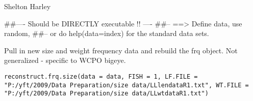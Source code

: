 \documentclass[a4paper]{book}
\begin{document}
%
\begin{Arguments}
\begin{ldescription}
\item[\code{CPUE.file}] 


\item[\code{data}] 


\item[\code{fishery}] 


\end{ldescription}
\end{Arguments}
%
\begin{Author}\relax

Shelton Harley
\end{Author}
%
\begin{Examples}
\begin{ExampleCode}
##---- Should be DIRECTLY executable !! ----
##-- ==>  Define data, use random,
##--	or do  help(data=index)  for the standard data sets.

\end{ExampleCode}
\end{Examples}
%
\begin{Description}\relax

Pull in new size and weight frequency data and rebuild the frq object. Not generalized - specific to WCPO bigeye. 
\end{Description}
%
\begin{Usage}
\begin{verbatim}
reconstruct.frq.size(data = data, FISH = 1, LF.FILE = "P:/yft/2009/Data Preparation/size data/LLlendataR1.txt", WT.FILE = "P:/yft/2009/Data Preparation/size data/LLwtdataR1.txt")
\end{verbatim}
\end{Usage}
%
\begin{Arguments}
\begin{ldescription}
\item[\code{data}] 


\item[\code{FISH}] 


\item[\code{LF.FILE}] 


\item[\code{WT.FILE}] 


\end{ldescription}
\end{Arguments}
\end{document}
